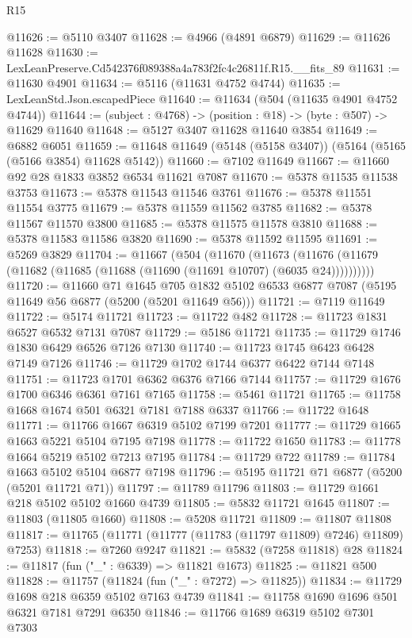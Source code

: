 \begin{lexlean}{R15}
\begin{coremodule}
{{{{{{{{{{{@11626 := @5110 @3407
@11628 := @4966 (@4891 @6879)
@11629 := @11626 @11628
@11630 := LexLeanPreserve.Cd542376f089388a4a783f2fc4c26811f.R15.__fits_89
@11631 := @11630 @4901
@11634 := @5116 (@11631 @4752 @4744)
@11635 := LexLeanStd.Json.escapedPiece
@11640 := @11634 (@504 (@11635 @4901 @4752 @4744))
@11644 := (subject : @4768) -> (position : @18) -> (byte : @507) -> @11629 @11640
@11648 := @5127 @3407 @11628 @11640 @3854
@11649 := @6882 @6051
@11659 := @11648 @11649 (@5148 (@5158 @3407)) (@5164 (@5165 (@5166 @3854) @11628 @5142))
@11660 := @7102 @11649
@11667 := @11660 @92 @28 @1833 @3852 @6534 @11621 @7087
@11670 := @5378 @11535 @11538 @3753
@11673 := @5378 @11543 @11546 @3761
@11676 := @5378 @11551 @11554 @3775
@11679 := @5378 @11559 @11562 @3785
@11682 := @5378 @11567 @11570 @3800
@11685 := @5378 @11575 @11578 @3810
@11688 := @5378 @11583 @11586 @3820
@11690 := @5378 @11592 @11595
@11691 := @5269 @3829
@11704 := @11667
    (@504
      (@11670
        (@11673 (@11676 (@11679 (@11682 (@11685 (@11688 (@11690 (@11691 @10707) (@6035 @24))))))))))
@11720 := @11660
    @71
    @1645
    @705
    @1832
    @5102
    @6533
    @6877
    @7087
    (@5195 @11649 @56 @6877 (@5200 (@5201 @11649 @56)))
@11721 := @7119 @11649
@11722 := @5174 @11721
@11723 := @11722 @482
@11728 := @11723 @1831 @6527 @6532 @7131 @7087
@11729 := @5186 @11721
@11735 := @11729 @1746 @1830 @6429 @6526 @7126 @7130
@11740 := @11723 @1745 @6423 @6428 @7149 @7126
@11746 := @11729 @1702 @1744 @6377 @6422 @7144 @7148
@11751 := @11723 @1701 @6362 @6376 @7166 @7144
@11757 := @11729 @1676 @1700 @6346 @6361 @7161 @7165
@11758 := @5461 @11721
@11765 := @11758 @1668 @1674 @501 @6321 @7181 @7188 @6337
@11766 := @11722 @1648
@11771 := @11766 @1667 @6319 @5102 @7199 @7201
@11777 := @11729 @1665 @1663 @5221 @5104 @7195 @7198
@11778 := @11722 @1650
@11783 := @11778 @1664 @5219 @5102 @7213 @7195
@11784 := @11729 @722
@11789 := @11784 @1663 @5102 @5104 @6877 @7198
@11796 := @5195 @11721 @71 @6877 (@5200 (@5201 @11721 @71))
@11797 := @11789 @11796
@11803 := @11729 @1661 @218 @5102 @5102 @1660 @4739
@11805 := @5832 @11721 @1645
@11807 := @11803 (@11805 @1660)
@11808 := @5208 @11721
@11809 := @11807 @11808
@11817 := @11765 (@11771 (@11777 (@11783 (@11797 @11809) @7246) @11809) @7253)
@11818 := @7260 @9247
@11821 := @5832 (@7258 @11818) @28
@11824 := @11817 (fun ("_" : @6339) => @11821 @1673)
@11825 := @11821 @500
@11828 := @11757 (@11824 (fun ("_" : @7272) => @11825))
@11834 := @11729 @1698 @218 @6359 @5102 @7163 @4739
@11841 := @11758 @1690 @1696 @501 @6321 @7181 @7291 @6350
@11846 := @11766 @1689 @6319 @5102 @7301 @7303
}}}}}}}}}}}
\end{coremodule}
\end{lexlean}

